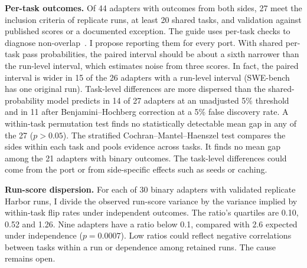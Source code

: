 \documentclass[conference]{IEEEtran}
\begin{document}
\textbf{Per-task outcomes.} Of 44 adapters with outcomes from both sides, 27 meet the inclusion criteria of replicate runs, at least 20 shared tasks, and validation against published scores or a documented exception. The guide uses per-task checks to diagnose non-overlap~\cite{harbor_contributing}. I propose reporting them for every port. With shared per-task pass probabilities, the paired interval should be about a sixth narrower than the run-level interval, which estimates noise from three scores. In fact, the paired interval is wider in 15 of the 26 adapters with a run-level interval (SWE-bench has one original run). Task-level differences are more dispersed than the shared-probability model predicts in 14 of 27 adapters at an unadjusted 5\% threshold and in 11 after Benjamini--Hochberg correction at a 5\% false discovery rate. A within-task permutation test finds no statistically detectable mean gap in any of the 27 ($p > 0.05$). The stratified Cochran--Mantel--Haenszel test compares the sides within each task and pools evidence across tasks. It finds no mean gap among the 21 adapters with binary outcomes. The task-level differences could come from the port or from side-specific effects such as seeds or caching.

\textbf{Run-score dispersion.} For each of 30 binary adapters with validated replicate Harbor runs, I divide the observed run-score variance by the variance implied by within-task flip rates under independent outcomes. The ratio's quartiles are 0.10, 0.52 and 1.26. Nine adapters have a ratio below 0.1, compared with 2.6 expected under independence ($p = 0.0007$). Low ratios could reflect negative correlations between tasks within a run or dependence among retained runs. The cause remains open.
\end{document}
